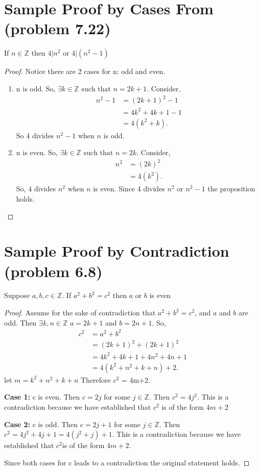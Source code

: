 \documentclass{article}
\newcommand{\Z}{\mathbb{Z}}
\newcommand{\st}{\text{ such that }}
\begin{document}
	\section*{Sample Proof by Cases From (problem 7.22)}
	If $n \in \Z$ then $4|n^2$ or $4|(n^2-1)$
	\begin{proof}
		Notice there are 2 cases for n: odd and even. 
		\begin{enumerate}[label={ Case \arabic*:}]
			\item n is odd. So, $\exists k \in \Z  \st n= 2k+1$. Consider,
			\begin{align*}
			n^2-1 &= (2k+1)^2-1\\
				&= 4k^2+ 4k +1-1\\
				&= 4(k^2+k).
			\end{align*}
			So $4$ divides $n^2-1$ when $n$ is odd. 
			\item n is even. So, $\exists k \in \Z  \st n= 2k$. Consider,
			\begin{align*}
				n^2 &= (2k)^2\\
				&= 4(k^2).
			\end{align*}
			So, $4$ divides $n^2$ when $n$ is even. Since 4 divides $n^2$ or $n^2-1$ the proposition holds.
		\end{enumerate}
	\end{proof}

	\section*{Sample Proof by Contradiction (problem 6.8)}
	Suppose $a,b,c \in \Z$. If $a^2+b^2=c^2$ then $a$ or $b$ is even
	\begin{proof}
		Assume for the sake of contradiction that $a^2+b^2=c^2$, and $a$ and $b$ are odd. Then $\exists k,n\in \Z$ \st $a=2k+1$ and $b = 2n+1$. So,
		\begin{align*}
		c^2 &= a^2 + b^2\\
		&= (2k+1)^2 + (2k+1)^2\\
		&= 4k^2 + 4k + 1 + 4n^2 + 4n + 1 \\
		&= 4(k^2+n^2 + k + n) + 2.
		\end{align*}
		let $m= k^2+n^2 + k + n$ Therefore $c^2$ = 4m+2.
		
		\textbf{Case 1:} c is even.
		Then $c= 2j$ for some $j \in \Z$. Then $c^2 = 4j^2$.
		This is a contradiction because we have established that $c^2 $ is of the form $ 4m + 2$
		
		\textbf{Case 2:} c is odd.
		Then $c= 2j+1$ for some $j \in \Z$. Then $c^2 = 4j^2+4j+ 1 =4(j^2+j)+1$. 
		This is a contradiction because we have established that $c^2 $is of the form $ 4m + 2$.
		
		Since both cases for c leads to a contradiction the original statement holds. 
	\end{proof}
	
\end{document}
